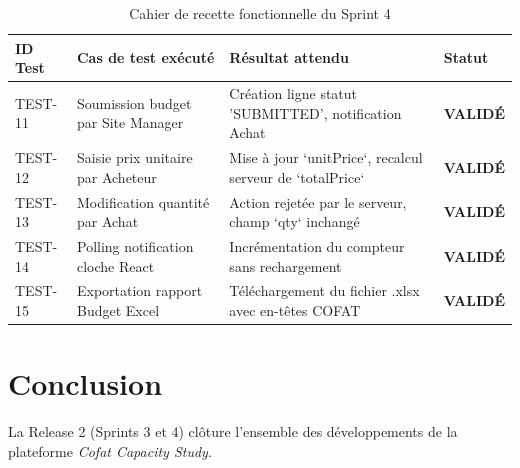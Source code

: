 \begin{table}[h]
\centering
\begin{tabular}{|p{1.5cm}|p{4.5cm}|p{5cm}|p{2.5cm}|}
\hline
\textbf{ID Test} & \textbf{Cas de test exécuté} & \textbf{Résultat attendu} & \textbf{Statut} \\ \hline
TEST-11 & Soumission budget par Site Manager & Création ligne statut 'SUBMITTED', notification Achat & \textbf{VALIDÉ} \\ \hline
TEST-12 & Saisie prix unitaire par Acheteur & Mise à jour `unitPrice`, recalcul serveur de `totalPrice` & \textbf{VALIDÉ} \\ \hline
TEST-13 & Modification quantité par Achat & Action rejetée par le serveur, champ `qty` inchangé & \textbf{VALIDÉ} \\ \hline
TEST-14 & Polling notification cloche React & Incrémentation du compteur sans rechargement & \textbf{VALIDÉ} \\ \hline
TEST-15 & Exportation rapport Budget Excel & Téléchargement du fichier .xlsx avec en-têtes COFAT & \textbf{VALIDÉ} \\ \hline
\end{tabular}
\caption{Cahier de recette fonctionnelle du Sprint 4}
\label{tab:recette_s4_ch4}
\end{table}

\section*{Conclusion}
La Release 2 (Sprints 3 et 4) clôture l'ensemble des développements de la plateforme \textit{Cofat Capacity Study}.
